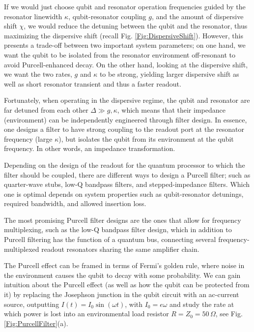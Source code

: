 \documentclass[aip,apr,twocolumn,showpacs,superscriptaddress,groupedaddress,nofootinbib,reprint]{revtex4-1}  %
\newcommand{\freq}{\omega_\text{q}}
\begin{document}
If we would just choose qubit and resonator operation frequencies guided by the resonator linewidth $\kappa$, qubit-resonator coupling $g$, and the amount of dispersive shift $\chi$, we would reduce the detuning between the qubit and the resonator, thus maximizing the dispersive shift (recall Fig. \ref{Fig:DispersiveShift}). However, this presents a trade-off between two important system parameters; on one hand, we want the qubit to be isolated from the resonator environment off-resonant to avoid Purcell-enhanced decay. On the other hand, looking at the dispersive shift, we want the two rates, $g$ and $\kappa$ to be strong, yielding larger dispersive shift as well as short resonator transient and thus a faster readout.

Fortunately, when operating in the dispersive regime, the qubit and resonator are far detuned from each other $\Delta \gg g,\kappa$, which means that their impedance (environment) can be independently engineered through filter design. In essence, one designs a filter to have strong coupling to the readout port at the resonator frequency (large $\kappa$), but isolates the qubit from its environment at the qubit frequency\cite{Reed2010a,Jeffrey2014}. In other words, an impedance transformation.


Depending on the design of the readout for the quantum processor to which the filter should be coupled, there are different ways to design a Purcell filter; such as quarter-wave stubs\cite{Reed2010a}, low-Q bandpass filters\cite{Jeffrey2014,Kelly2015}, and stepped-impedance filters\cite{Bronn2015}. Which one is optimal depends on system properties such as qubit-resonator detunings, required bandwidth, and allowed insertion loss.

The most promising Purcell filter designs are the ones that allow for frequency multiplexing, such as the low-Q bandpass filter design\cite{Jeffrey2014,Kelly2015}, which in addition to Purcell filtering has the function of a quantum bus, connecting several frequency-multiplexed readout resonators sharing the same amplifier chain.

The Purcell effect can be framed in terms of Fermi's golden rule, where noise in the environment causes the qubit to decay with some probability. We can gain intuition about the Purcell effect (as well as how the qubit can be protected from it) by replacing the Josephson junction in the qubit circuit with an ac-current source, outputting $I(t) = I_0\sin(\omega t)$, with $I_0 = e\omega$ and study the rate at which power is lost into an environmental load resistor $R = Z_0 = 50\,\Omega$, see Fig. \ref{Fig:PurcellFilter}(a).
\end{document}
